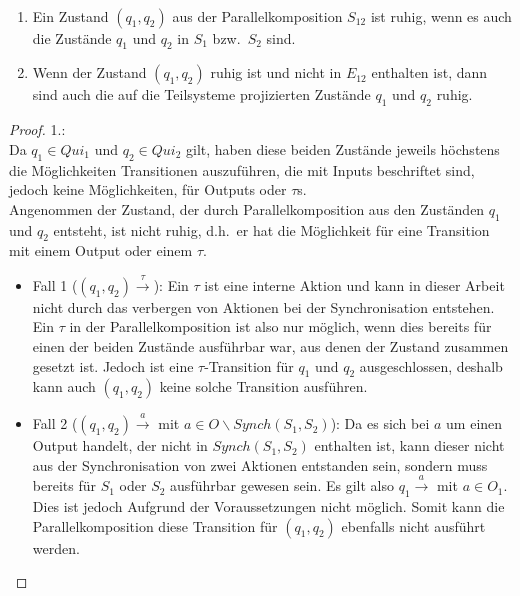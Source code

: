 \begin{lem}
\label{lemRuheParallelkomp}
  ~
  \begin{enumerate}
    \item Ein Zustand $(q_1,q_2)$ aus der Parallelkomposition $S_{12}$
      ist ruhig, wenn es auch die Zustände $q_1$ und $q_2$ in $S_1$ bzw.\ $S_2$
      sind.
    \item Wenn der Zustand $(q_1,q_2)$ ruhig ist und nicht in $E_{12}$
      enthalten ist, dann sind auch die auf die Teilsysteme projizierten
      Zustände $q_1$ und $q_2$ ruhig.
  \end{enumerate}
\end{lem}

\begin{proof}
  1.:\\
  Da $q_1\in Qui_1$ und $q_2\in Qui_2$ gilt, haben
  diese beiden Zustände jeweils höchstens die Möglichkeiten Transitionen
  auszuführen, die mit Inputs beschriftet sind, jedoch keine Möglichkeiten, für
  Outputs oder $\tau$s.\\
  Angenommen der Zustand, der durch Parallelkomposition aus den Zuständen $q_1$
  und $q_2$ entsteht, ist nicht ruhig, d.h.\ er hat die Möglichkeit für eine
  Transition mit einem Output oder einem $\tau$.
  \begin{itemize}
    \item Fall 1 ($(q_1,q_2) \overset{\tau}{\rightarrow}$): Ein $\tau$ ist eine
      interne Aktion und kann in dieser Arbeit nicht durch das verbergen von
      Aktionen bei der Synchronisation entstehen. Ein $\tau$ in der
      Parallelkomposition ist also nur möglich, wenn dies bereits für einen der
      beiden Zustände ausführbar war, aus denen der Zustand zusammen gesetzt
      ist. Jedoch ist eine $\tau$-Transition für $q_1$ und $q_2$
      ausgeschlossen, deshalb kann auch $(q_1,q_2)$ keine solche Transition
      ausführen.
    \item Fall 2 ($(q_1,q_2) \overset{a}{\rightarrow}$ mit $a\in O\backslash
      Synch(S_1,S_2)$): Da es sich bei $a$ um einen Output handelt, der nicht
      in $Synch(S_1,S_2)$ enthalten ist, kann dieser nicht aus der
      Synchronisation von zwei Aktionen entstanden sein, sondern muss bereits
      für $S_1$ oder $S_2$ ausführbar gewesen sein. Es gilt also \oBdA{} $q_1
      \overset{a}{\rightarrow}$ mit $a\in O_1$. Dies ist jedoch Aufgrund der
      Voraussetzungen nicht möglich. Somit kann die Parallelkomposition
      diese Transition für $(q_1,q_2)$ ebenfalls nicht ausführt werden.

\end{itemize}
\end{proof}
